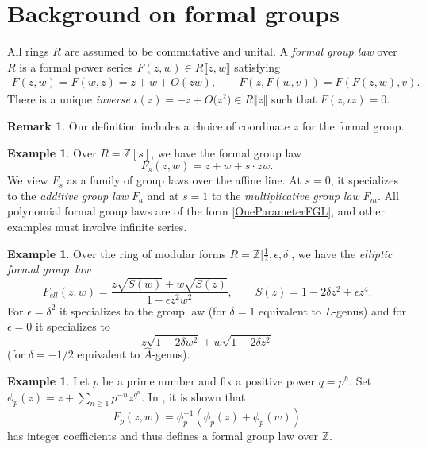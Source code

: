 \documentclass[10pt,a4paper]{amsart}
\numberwithin{equation}{section}
\theoremstyle{definition}
\newtheorem{Example}[Theorem]{Example}
\newtheorem{Remark}[Theorem]{Remark}
\def\lb{\llbracket}
\def\rb{\rrbracket}
\begin{document}
\section{Background on formal groups}
\label{s2}

All rings $R$ are assumed to be commutative and unital. A \emph{formal group law} over $R$ is a formal power series $F(z,w)\in R\lb z,w\rb$ satisfying
\begin{align}
 F(z,w)=F(w,z)=z+w+O(zw),
\qquad
F(z,F(w,v))=F(F(z,w),v).\label{s1eqn1}
\end{align}
There is a unique \emph{inverse} $\iota(z)=-z+O\bigl(z^2\bigr)\in R\lb z\rb$ such that $F(z,\iota z)=0$.

\begin{Remark}
Our definition includes a choice of coordinate $z$ for the formal group.
\end{Remark}

\begin{Example}
Over $R=\mathbb{Z}[s]$, we have the formal group law
\begin{equation}\label{OneParameterFGL}
 F_s(z,w)=z+w+s\cdot zw.
\end{equation}
We view $F_s$ as a family of group laws over the affine line. At $s=0$, it specializes to the \emph{additive group law} $F_a$ and at $s=1$ to the \emph{multiplicative group law} $F_m$. All polynomial formal group laws are of the form \eqref{OneParameterFGL}, and other examples must involve infinite series.
\end{Example}

\begin{Example}
Over the ring of modular forms $R=\mathbb{Z}\big[\frac12,\epsilon,\delta\big]$, we have the \emph{elliptic formal group~law}
\[
 F_{ell}(z,w)=\frac{z\sqrt{S(w)}+w\sqrt{S(z)}}{1-\epsilon z^2w^2},\qquad S(z)=1-2\delta z^2+\epsilon z^4.
\]
For $\epsilon=\delta^2$ it specializes to the group law
(for $\delta=1$ equivalent to $L$-genus) and for $\epsilon=0$ it specializes to
\[
 z\sqrt{1-2\delta w^2}+w\sqrt{1-2\delta z^2}
\]
(for $\delta=-1/2$ equivalent to $\hat{A}$-genus).
\end{Example}

\begin{Example}
\label{PrimeFGL}
 Let $p$ be a prime number and fix a positive power $q=p^h$. Set $\phi_p(z)=z+\sum_{n\geqslant1}p^{-n}z^{q^n}$. In \cite{Haze}, it is shown that
\[
 F_p(z,w)=\phi_p^{-1}(\phi_p(z)+\phi_p(w))
\]
 has integer coefficients and thus defines a formal group law over $\mathbb{Z}$.
\end{Example}
\end{document}
